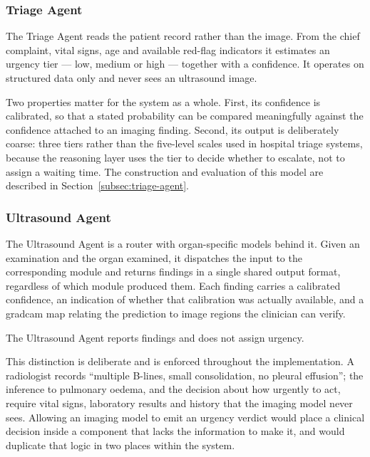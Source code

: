 \subsubsection{Triage Agent}

The Triage Agent reads the patient record rather than the image. From the chief complaint,
vital signs, age and available red-flag indicators it estimates an urgency tier --- low,
medium or high --- together with a confidence. It operates on structured data only and
never sees an ultrasound image.

Two properties matter for the system as a whole. First, its confidence is calibrated, so
that a stated probability can be compared meaningfully against the confidence attached to
an imaging finding. Second, its output is deliberately coarse: three tiers rather than the
five-level scales used in hospital triage systems, because the reasoning layer uses the
tier to decide whether to escalate, not to assign a waiting time. The construction and
evaluation of this model are described in Section~\ref{subsec:triage-agent}.

\subsubsection{Ultrasound Agent}

The Ultrasound Agent is a router with organ-specific models behind it. Given an
examination and the organ examined, it dispatches the input to the corresponding module
and returns findings in a single shared output format, regardless of which module
produced them. Each finding carries a calibrated confidence, an indication of whether that
calibration was actually available, and a \gls{gradcam} map relating the prediction to
image regions the clinician can verify.

\begin{keystatement}
The Ultrasound Agent reports findings and does not assign urgency.
\end{keystatement}

This distinction is deliberate and is enforced throughout the implementation. A
radiologist records ``multiple B-lines, small consolidation, no pleural effusion''; the
inference to pulmonary oedema, and the decision about how urgently to act, require vital
signs, laboratory results and history that the imaging model never sees. Allowing an
imaging model to emit an urgency verdict would place a clinical decision inside a
component that lacks the information to make it, and would duplicate that logic in two
places within the system.

